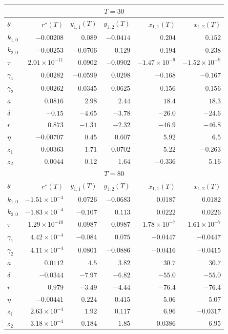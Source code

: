 \begin{tabular}{lrrrrr}
\toprule
\multicolumn{6}{c}{$T = 30$} \\
\midrule
$\theta$ & $r^{\star}(T)$ & $y_{1,1}(T)$ & $y_{1,2}(T)$ & $x_{1,1}(T)$ & $x_{1,2}(T)$ \\
\midrule
$k_{1,0}$ & $-0.00208$ & $0.089$ & $-0.0414$ & $0.204$ & $0.152$ \\
$k_{2,0}$ & $-0.00253$ & $-0.0706$ & $0.129$ & $0.194$ & $0.238$ \\
$\tau$ & $2.01 \times 10^{-11}$ & $0.0902$ & $-0.0902$ & $-1.47 \times 10^{-9}$ & $-1.52 \times 10^{-9}$ \\
$\gamma_1$ & $0.00282$ & $-0.0599$ & $0.0298$ & $-0.168$ & $-0.167$ \\
$\gamma_2$ & $0.00262$ & $0.0345$ & $-0.0625$ & $-0.156$ & $-0.156$ \\
$a$ & $0.0816$ & $2.98$ & $2.44$ & $18.4$ & $18.3$ \\
$\delta$ & $-0.15$ & $-4.65$ & $-3.78$ & $-26.0$ & $-24.6$ \\
$r$ & $0.873$ & $-1.31$ & $-2.32$ & $-46.9$ & $-46.8$ \\
$\eta$ & $-0.00707$ & $0.45$ & $0.607$ & $5.92$ & $6.5$ \\
$z_1$ & $0.00363$ & $1.71$ & $0.0702$ & $5.22$ & $-0.263$ \\
$z_2$ & $0.0044$ & $0.12$ & $1.64$ & $-0.336$ & $5.16$ \\
\midrule
\multicolumn{6}{c}{$T = 80$} \\
\midrule
$\theta$ & $r^{\star}(T)$ & $y_{1,1}(T)$ & $y_{1,2}(T)$ & $x_{1,1}(T)$ & $x_{1,2}(T)$ \\
\midrule
$k_{1,0}$ & $-1.51 \times 10^{-4}$ & $0.0726$ & $-0.0683$ & $0.0187$ & $0.0182$ \\
$k_{2,0}$ & $-1.83 \times 10^{-4}$ & $-0.107$ & $0.113$ & $0.0222$ & $0.0226$ \\
$\tau$ & $1.29 \times 10^{-10}$ & $0.0987$ & $-0.0987$ & $-1.78 \times 10^{-7}$ & $-1.61 \times 10^{-7}$ \\
$\gamma_1$ & $4.42 \times 10^{-4}$ & $-0.084$ & $0.075$ & $-0.0447$ & $-0.0447$ \\
$\gamma_2$ & $4.11 \times 10^{-4}$ & $0.0801$ & $-0.0886$ & $-0.0416$ & $-0.0415$ \\
$a$ & $0.0112$ & $4.5$ & $3.82$ & $30.7$ & $30.7$ \\
$\delta$ & $-0.0344$ & $-7.97$ & $-6.82$ & $-55.0$ & $-55.0$ \\
$r$ & $0.979$ & $-3.49$ & $-4.44$ & $-76.4$ & $-76.4$ \\
$\eta$ & $-0.00441$ & $0.224$ & $0.415$ & $5.06$ & $5.07$ \\
$z_1$ & $2.63 \times 10^{-4}$ & $1.92$ & $0.117$ & $6.96$ & $-0.0317$ \\
$z_2$ & $3.18 \times 10^{-4}$ & $0.184$ & $1.85$ & $-0.0386$ & $6.95$ \\
\bottomrule
\end{tabular}
